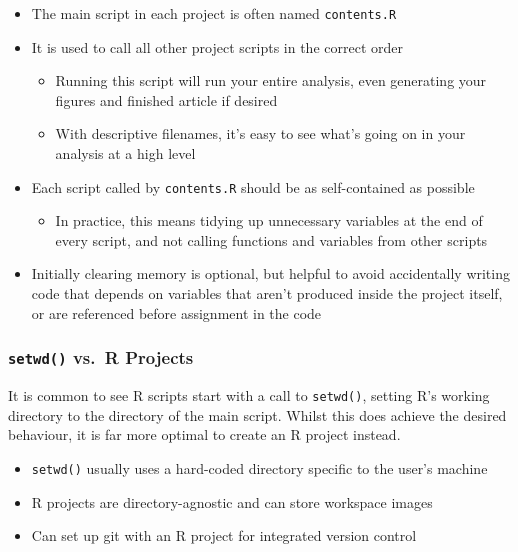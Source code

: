 \documentclass[
]{article}
\providecommand{\tightlist}{%
  \setlength{\itemsep}{0pt}\setlength{\parskip}{0pt}}
\begin{document}
\begin{itemize}
\item
  The main script in each project is often named \texttt{contents.R}
\item
  It is used to call all other project scripts in the correct order

  \begin{itemize}
  \item
    Running this script will run your entire analysis, even generating
    your figures and finished article if desired
  \item
    With descriptive filenames, it's easy to see what's going on in your
    analysis at a high level
  \end{itemize}
\item
  Each script called by \texttt{contents.R} should be as self-contained
  as possible

  \begin{itemize}
  \tightlist
  \item
    In practice, this means tidying up unnecessary variables at the end
    of every script, and not calling functions and variables from other
    scripts
  \end{itemize}
\item
  Initially clearing memory is optional, but helpful to avoid
  accidentally writing code that depends on variables that aren't
  produced inside the project itself, or are referenced before
  assignment in the code
\end{itemize}

\hypertarget{setwd-vs.-r-projects}{%
\subsubsection{\texorpdfstring{\texttt{setwd()} vs.~R
Projects}{setwd() vs.~R Projects}}\label{setwd-vs.-r-projects}}

It is common to see R scripts start with a call to \texttt{setwd()},
setting R's working directory to the directory of the main script.
Whilst this does achieve the desired behaviour, it is far more optimal
to create an R project instead.

\begin{itemize}
\tightlist
\item
  \texttt{setwd()} usually uses a hard-coded directory specific to the
  user's machine
\item
  R projects are directory-agnostic and can store workspace images
\item
  Can set up git with an R project for integrated version control
\end{itemize}
\end{document}
